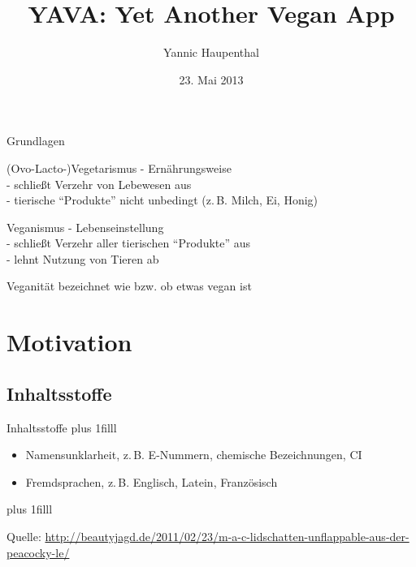 \documentclass{beamer}
\title[YAVA]{YAVA: Yet Another Vegan App}
\author[Y. Haupenthal]{Yannic Haupenthal}
\institute[UdS]{Universität des Saarlandes}
\date[23.05.2013]{23. Mai 2013}
\begin{document}
\frame{
	\titlepage
}

\begin{frame}{Grundlagen}
		\begin{block}{(Ovo-Lacto-)Vegetarismus}
		- Ernährungsweise\\
		- schließt Verzehr von Lebewesen aus\\
		- tierische ``Produkte'' nicht unbedingt (z.\,B. Milch, Ei,
		Honig)
	\end{block}

	\begin{block}{Veganismus}
		- Lebenseinstellung\\
		- schließt Verzehr aller tierischen ``Produkte'' aus\\
		- lehnt Nutzung von Tieren ab
	\end{block}

	\begin{block}{Veganität}
		bezeichnet wie bzw. ob etwas vegan ist
	\end{block}
\end{frame}


\section{Motivation}
\subsection*{Inhaltsstoffe}
\begin{frame}{Inhaltsstoffe}
	\vskip0pt plus 1filll
	\begin{center}
	\end{center}

	\begin{itemize}
		\item Namensunklarheit, z.\,B. E-Nummern, chemische
				Bezeichnungen, CI
		\item Fremdsprachen, z.\,B. Englisch, Latein, Französisch
	\end{itemize}
	\vskip0pt plus 1filll
	\par\hrulefill\par
	\tiny{Quelle: \url{http://beautyjagd.de/2011/02/23/m-a-c-lidschatten-unflappable-aus-der-peacocky-le/}}
\end{frame}
\end{document}
